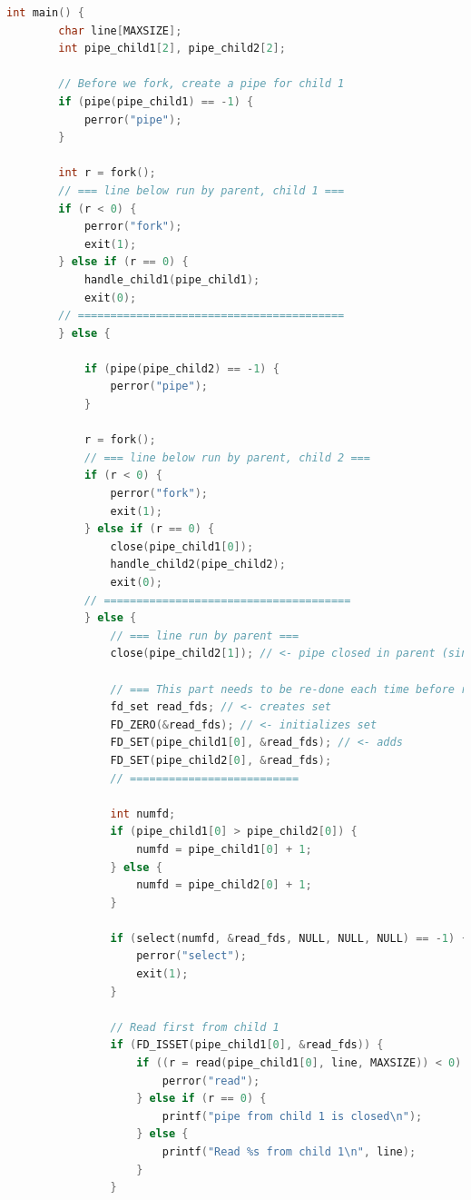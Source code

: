\documentclass[12pt]{article}
\begin{document}
\begin{itemize}
\begin{lstlisting}[language=c, caption={select\_example\_2\_1.c}]
    int main() {
        char line[MAXSIZE];
        int pipe_child1[2], pipe_child2[2];

        // Before we fork, create a pipe for child 1
        if (pipe(pipe_child1) == -1) {
            perror("pipe");
        }

        int r = fork();
        // === line below run by parent, child 1 ===
        if (r < 0) {
            perror("fork");
            exit(1);
        } else if (r == 0) {
            handle_child1(pipe_child1);
            exit(0);
        // =========================================
        } else {

            if (pipe(pipe_child2) == -1) {
                perror("pipe");
            }

            r = fork();
            // === line below run by parent, child 2 ===
            if (r < 0) {
                perror("fork");
                exit(1);
            } else if (r == 0) {
                close(pipe_child1[0]);
                handle_child2(pipe_child2);
                exit(0);
            // ======================================
            } else {
                // === line run by parent ===
                close(pipe_child2[1]); // <- pipe closed in parent (since write is for children only)

                // === This part needs to be re-done each time before read by parent===
                fd_set read_fds; // <- creates set
                FD_ZERO(&read_fds); // <- initializes set
                FD_SET(pipe_child1[0], &read_fds); // <- adds
                FD_SET(pipe_child2[0], &read_fds);
                // ==========================

                int numfd;
                if (pipe_child1[0] > pipe_child2[0]) {
                    numfd = pipe_child1[0] + 1;
                } else {
                    numfd = pipe_child2[0] + 1;
                }

                if (select(numfd, &read_fds, NULL, NULL, NULL) == -1) {
                    perror("select");
                    exit(1);
                }

                // Read first from child 1
                if (FD_ISSET(pipe_child1[0], &read_fds)) {
                    if ((r = read(pipe_child1[0], line, MAXSIZE)) < 0) {
                        perror("read");
                    } else if (r == 0) {
                        printf("pipe from child 1 is closed\n");
                    } else {
                        printf("Read %s from child 1\n", line);
                    }
                }


\end{lstlisting}
\end{itemize}
\end{document}
